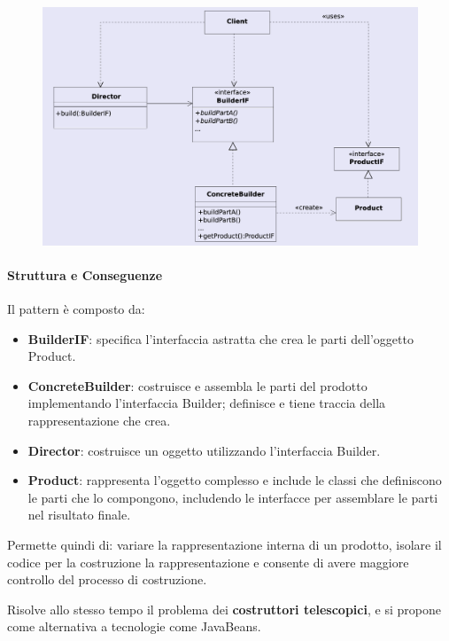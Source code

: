 \begin{figure}[H]
    \centering
    \includegraphics[width=1\linewidth]{assets/pattern/builder/builder-struttura.png}
\end{figure}

\paragraph{Struttura e Conseguenze} Il pattern è composto da:
\begin{itemize}
    \item \textbf{BuilderIF}: specifica l’interfaccia astratta che crea le parti dell’oggetto Product. 
    \item \textbf{ConcreteBuilder}: costruisce e assembla le parti del prodotto implementando l’interfaccia Builder; definisce e tiene traccia della rappresentazione che crea.
    \item \textbf{Director}: costruisce un oggetto utilizzando l’interfaccia Builder.
    \item \textbf{Product}: rappresenta l’oggetto complesso e include le classi che definiscono le parti che lo compongono, includendo le interfacce per assemblare le parti nel risultato finale.
\end{itemize}

Permette quindi di: variare la rappresentazione interna di un prodotto, isolare il codice per la costruzione la rappresentazione e consente di avere maggiore controllo del processo di costruzione.

Risolve allo stesso tempo il problema dei \textbf{costruttori telescopici}, e si propone come alternativa a tecnologie come JavaBeans.

\newpage

